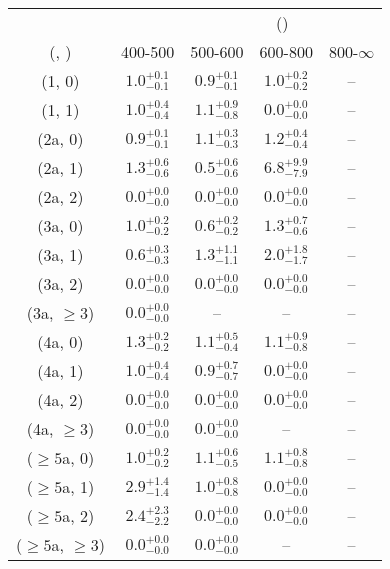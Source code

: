 \begin{table}[h!]
\tiny
\centering
{}
\begin{tabular}
{ccccc}
	\hline\hline
&	& \multicolumn{4}{c}{\scalht (\gev)} \\ 
	 (\njet,  \nb) & 400-500 & 500-600 & 600-800 & 800-$\infty$ \\ [0.8ex] 
\hline
	(1, 0) & $1.0^{+ 0.1 }_{- 0.1 }$ & $0.9^{+ 0.1 }_{- 0.1 }$ & $1.0^{+ 0.2 }_{- 0.2 }$ & -- \\[0.5ex] 
	(1, 1) & $1.0^{+ 0.4 }_{- 0.4 }$ & $1.1^{+ 0.9 }_{- 0.8 }$ & $0.0^{+ 0.0 }_{- 0.0 }$ & -- \\[0.5ex] 
	(2a, 0) & $0.9^{+ 0.1 }_{- 0.1 }$ & $1.1^{+ 0.3 }_{- 0.3 }$ & $1.2^{+ 0.4 }_{- 0.4 }$ & -- \\[0.5ex] 
	(2a, 1) & $1.3^{+ 0.6 }_{- 0.6 }$ & $0.5^{+ 0.6 }_{- 0.6 }$ & $6.8^{+ 9.9 }_{- 7.9 }$ & -- \\[0.5ex] 
	(2a, 2) & $0.0^{+ 0.0 }_{- 0.0 }$ & $0.0^{+ 0.0 }_{- 0.0 }$ & $0.0^{+ 0.0 }_{- 0.0 }$ & -- \\[0.5ex] 
	(3a, 0) & $1.0^{+ 0.2 }_{- 0.2 }$ & $0.6^{+ 0.2 }_{- 0.2 }$ & $1.3^{+ 0.7 }_{- 0.6 }$ & -- \\[0.5ex] 
	(3a, 1) & $0.6^{+ 0.3 }_{- 0.3 }$ & $1.3^{+ 1.1 }_{- 1.1 }$ & $2.0^{+ 1.8 }_{- 1.7 }$ & -- \\[0.5ex] 
	(3a, 2) & $0.0^{+ 0.0 }_{- 0.0 }$ & $0.0^{+ 0.0 }_{- 0.0 }$ & $0.0^{+ 0.0 }_{- 0.0 }$ & -- \\[0.5ex] 
	(3a, $\ge3$) & $0.0^{+ 0.0 }_{- 0.0 }$ & -- & -- & -- \\[0.5ex] 
	(4a, 0) & $1.3^{+ 0.2 }_{- 0.2 }$ & $1.1^{+ 0.5 }_{- 0.4 }$ & $1.1^{+ 0.9 }_{- 0.8 }$ & -- \\[0.5ex] 
	(4a, 1) & $1.0^{+ 0.4 }_{- 0.4 }$ & $0.9^{+ 0.7 }_{- 0.7 }$ & $0.0^{+ 0.0 }_{- 0.0 }$ & -- \\[0.5ex] 
	(4a, 2) & $0.0^{+ 0.0 }_{- 0.0 }$ & $0.0^{+ 0.0 }_{- 0.0 }$ & $0.0^{+ 0.0 }_{- 0.0 }$ & -- \\[0.5ex] 
	(4a, $\ge3$) & $0.0^{+ 0.0 }_{- 0.0 }$ & $0.0^{+ 0.0 }_{- 0.0 }$ & -- & -- \\[0.5ex] 
	($\ge5$a, 0) & $1.0^{+ 0.2 }_{- 0.2 }$ & $1.1^{+ 0.6 }_{- 0.5 }$ & $1.1^{+ 0.8 }_{- 0.8 }$ & -- \\[0.5ex] 
	($\ge5$a, 1) & $2.9^{+ 1.4 }_{- 1.4 }$ & $1.0^{+ 0.8 }_{- 0.8 }$ & $0.0^{+ 0.0 }_{- 0.0 }$ & -- \\[0.5ex] 
	($\ge5$a, 2) & $2.4^{+ 2.3 }_{- 2.2 }$ & $0.0^{+ 0.0 }_{- 0.0 }$ & $0.0^{+ 0.0 }_{- 0.0 }$ & -- \\[0.5ex] 
	($\ge5$a, $\ge3$) & $0.0^{+ 0.0 }_{- 0.0 }$ & $0.0^{+ 0.0 }_{- 0.0 }$ & -- & -- \\[0.5ex] 
	\hline
	\hline
\end{tabular}
\end{table}
